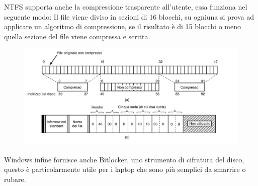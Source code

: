 NTFS supporta anche la compressione trasparente all'utente, essa funziona nel seguente modo:
Il file viene diviso in sezioni di 16 blocchi, su ogniuna si prova ad applicare un algoritmo di compressione, se il risultato è di 15 blocchi o meno quella sezione del file viene compressa e scritta.

\begin{figure}[H]
    \centering
    \includegraphics[width=0.75\linewidth]{assets/windows-MFT-compression.png}
\end{figure}

Windows infine fornisce anche Bitlocker, uno strumento di cifratura del disco, questo è particolarmente utile per i laptop che sono più semplici da smarrire o rubare.